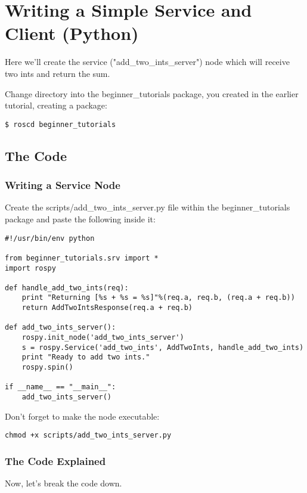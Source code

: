\section{Writing a Simple Service and Client (Python)}
Here we'll create the service ("add\_two\_ints\_server") node which will receive two ints and return the sum.



Change directory into the beginner\_tutorials package, you created in the earlier tutorial, creating a package:

\begin{lstlisting}[breaklines=true languages=bash]
$ roscd beginner_tutorials
\end{lstlisting}

\subsection{The Code}

\subsubsection{Writing a Service Node}
Create the scripts/add\_two\_ints\_server.py file within the beginner\_tutorials package and paste the following inside it:

\begin{lstlisting}[breaklines=true language=python]
#!/usr/bin/env python

from beginner_tutorials.srv import *
import rospy

def handle_add_two_ints(req):
	print "Returning [%s + %s = %s]"%(req.a, req.b, (req.a + req.b))
	return AddTwoIntsResponse(req.a + req.b)

def add_two_ints_server():
	rospy.init_node('add_two_ints_server')
	s = rospy.Service('add_two_ints', AddTwoInts, handle_add_two_ints)
	print "Ready to add two ints."
	rospy.spin()

if __name__ == "__main__":
	add_two_ints_server()
\end{lstlisting}

Don't forget to make the node executable:

\begin{lstlisting}[breaklines=true languages=bash]
chmod +x scripts/add_two_ints_server.py
\end{lstlisting}

\subsubsection{The Code Explained}
Now, let's break the code down.

